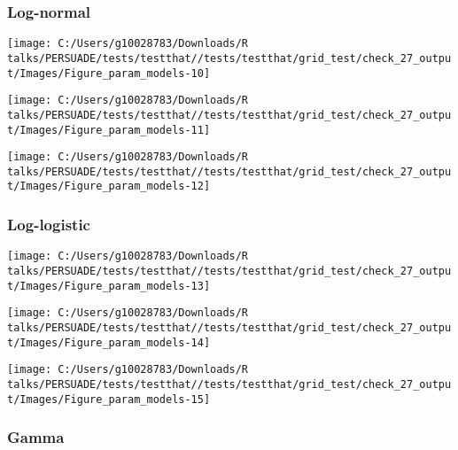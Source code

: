 \documentclass[
]{article}
\begin{document}
\subsubsection{Log-normal}\label{log-normal}

\begin{flushleft}\texttt{[image: C:/Users/g10028783/Downloads/R talks/PERSUADE/tests/testthat//tests/testthat/grid\_test/check\_27\_output/Images/Figure\_param\_models-10]} \end{flushleft}

\begin{flushleft}\texttt{[image: C:/Users/g10028783/Downloads/R talks/PERSUADE/tests/testthat//tests/testthat/grid\_test/check\_27\_output/Images/Figure\_param\_models-11]} \end{flushleft}

\begin{flushleft}\texttt{[image: C:/Users/g10028783/Downloads/R talks/PERSUADE/tests/testthat//tests/testthat/grid\_test/check\_27\_output/Images/Figure\_param\_models-12]} \end{flushleft}

\clearpage

\subsubsection{Log-logistic}\label{log-logistic}

\begin{flushleft}\texttt{[image: C:/Users/g10028783/Downloads/R talks/PERSUADE/tests/testthat//tests/testthat/grid\_test/check\_27\_output/Images/Figure\_param\_models-13]} \end{flushleft}

\begin{flushleft}\texttt{[image: C:/Users/g10028783/Downloads/R talks/PERSUADE/tests/testthat//tests/testthat/grid\_test/check\_27\_output/Images/Figure\_param\_models-14]} \end{flushleft}

\begin{flushleft}\texttt{[image: C:/Users/g10028783/Downloads/R talks/PERSUADE/tests/testthat//tests/testthat/grid\_test/check\_27\_output/Images/Figure\_param\_models-15]} \end{flushleft}

\clearpage

\subsubsection{Gamma}\label{gamma}
\end{document}
